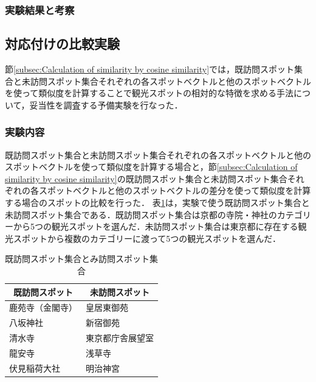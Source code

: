 \documentclass{deimj}
\begin{document}
\subsubsection{実験結果と考察}



\subsection{対応付けの比較実験}
\label{subsec:Comparative experiment of correspondence}
節\ref{subsec:Calculation of similarity by cosine similarity}では，既訪問スポット集合と未訪問スポット集合それぞれの各スポットベクトルと他のスポットベクトルを使って類似度を計算することで観光スポットの相対的な特徴を求める手法について，妥当性を調査する予備実験を行なった．

\subsubsection{実験内容}
\label{subsec:FF Experiment Contents}
既訪問スポット集合と未訪問スポット集合それぞれの各スポットベクトルと他のスポットベクトルを使って類似度を計算する場合と，節\ref{subsec:Calculation of similarity by cosine similarity}の既訪問スポット集合と未訪問スポット集合それぞれの各スポットベクトルと他のスポットベクトルの差分を使って類似度を計算する場合のスポットの比較を行った．
表\ref{table:既訪問スポット集合とみ訪問スポット集合}は，実験で使う既訪問スポット集合と未訪問スポット集合である．既訪問スポット集合は京都の寺院・神社のカテゴリーから5つの観光スポットを選んだ．未訪問スポット集合は東京都に存在する観光スポットから複数のカテゴリーに渡って5つの観光スポットを選んだ．
\begin{table}[t]
    \caption{既訪問スポット集合とみ訪問スポット集合}
    \label{table:既訪問スポット集合とみ訪問スポット集合}
    \centering
    \begin{tabular}{|l|l|}
    \hline
    \multicolumn{1}{|c|}{既訪問スポット} & \multicolumn{1}{c|}{未訪問スポット} \\ \hline
    鹿苑寺（金閣寺） & 皇居東御苑    \\ \hline
    八坂神社  & 新宿御苑   \\ \hline
    清水寺   & 東京都庁舎展望室        \\ \hline
    龍安寺   & 浅草寺      \\ \hline
    伏見稲荷大社   & 明治神宮       \\ \hline
    \end{tabular}
\end{table}
\end{document}
